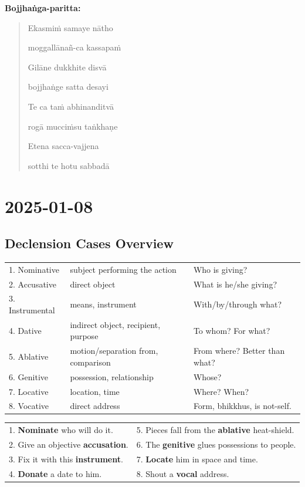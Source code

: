 \documentclass[11pt,oneside]{memoir}
\begin{document}
\textbf{Bojjhaṅga-paritta:}

\begin{quote}
Ekasmiṁ samaye nātho

moggallānañ-ca kassapaṁ

Gilāne dukkhite disvā

bojjhaṅge satta desayi

Te ca taṁ abhinanditvā

rogā mucciṁsu taṅkhaṇe

Etena sacca-vajjena

sotthi te hotu sabbadā
\end{quote}

\chapter{2025-01-08}
\label{sec:org6c21d19}
\section{Declension Cases Overview}
\label{sec:orgc20405d}

\begin{tabular}{lll}
1. Nominative & subject performing the action & Who is giving?\\[0pt]
2. Accusative & direct object & What is he/she giving?\\[0pt]
3. Instrumental & means, instrument & With/by/through what?\\[0pt]
4. Dative & indirect object, recipient, purpose & To whom? For what?\\[0pt]
5. Ablative & motion/separation from, comparison & From where? Better than what?\\[0pt]
6. Genitive & possession, relationship & Whose?\\[0pt]
7. Locative & location, time & Where? When?\\[0pt]
8. Vocative & direct address & Form, bhikkhus, is not-self.\\[0pt]
\end{tabular}


\begin{center}
\begin{tabular}{ll}
1. \textbf{Nominate} who will do it. & 5. Pieces fall from the \textbf{ablative} heat-shield.\\[0pt]
2. Give an objective \textbf{accusation}. & 6. The \textbf{genitive} glues possessions to people.\\[0pt]
3. Fix it with this \textbf{instrument}. & 7. \textbf{Locate} him in space and time.\\[0pt]
4. \textbf{Donate} a date to him. & 8. Shout a \textbf{vocal} address.\\[0pt]
\end{tabular}
\end{center}
\end{document}
